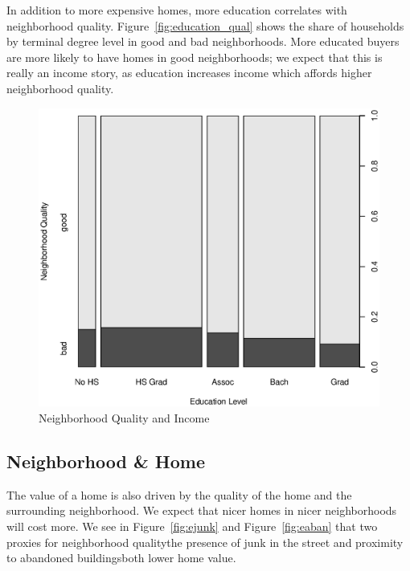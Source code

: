 \documentclass[11pt, fleqn]{article}
\begin{document}
In addition to more expensive homes, more education correlates with neighborhood quality. Figure~\vref{fig:education_qual} shows the share of households by terminal degree level in good and bad neighborhoods. More educated buyers are more likely to have homes in good neighborhoods; we expect that this is really an income story, as education increases income which affords higher neighborhood quality.

\begin{figure}[!htb]
  \centering
  \includegraphics[scale=.5]{neighborhood_quality_vs_education.eps}
  \caption{Neighborhood Quality and Income}
  \label{fig:education_qual}
\end{figure}

\subsection{Neighborhood \& Home}

The value of a home is also driven by the quality of the home and the surrounding neighborhood. We expect that nicer homes in nicer neighborhoods will cost more. We see in Figure~\vref{fig:ejunk} and Figure~\vref{fig:eaban} that two proxies for neighborhood quality\textemdash the presence of junk in the street and proximity to abandoned buildings\textemdash both lower home value. 
\end{document}
